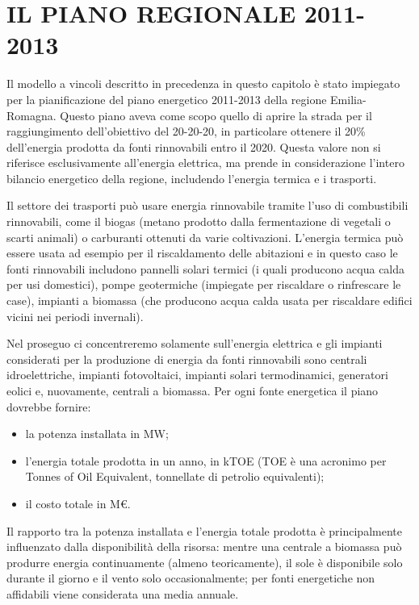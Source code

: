 \documentclass[12pt,a4paper,openright,twoside]{report}
\begin{document}
\section{IL PIANO REGIONALE 2011-2013}
Il modello a vincoli descritto in precedenza in questo capitolo è stato impiegato per la pianificazione del piano energetico 2011-2013 della regione Emilia-Romagna. Questo piano aveva come scopo quello di aprire la strada per il raggiungimento dell'obiettivo del 20-20-20, in particolare ottenere il 20\% dell'energia prodotta da fonti rinnovabili entro il 2020. Questa valore non si riferisce esclusivamente all'energia elettrica, ma prende in considerazione l'intero bilancio energetico della regione, includendo l'energia termica e i trasporti. 

Il settore dei trasporti può usare energia rinnovabile tramite l'uso di combustibili rinnovabili, come il biogas (metano prodotto dalla fermentazione di vegetali o scarti animali) o carburanti ottenuti da varie coltivazioni. L'energia termica può essere usata ad esempio per il riscaldamento delle abitazioni e in questo caso le fonti rinnovabili includono pannelli solari termici (i quali producono acqua calda per usi domestici), pompe geotermiche (impiegate per riscaldare o rinfrescare le case), impianti a biomassa (che producono acqua calda usata per riscaldare edifici vicini nei periodi invernali). 

Nel proseguo ci concentreremo solamente sull'energia elettrica e gli impianti considerati per la produzione di energia da fonti rinnovabili sono centrali idroelettriche, impianti fotovoltaici, impianti solari termodinamici, generatori eolici e, nuovamente, centrali a biomassa. Per ogni fonte energetica il piano dovrebbe fornire:
\begin{itemize}
\item la potenza installata in MW;
\item l'energia totale prodotta in un anno, in kTOE (TOE è una acronimo per Tonnes of Oil Equivalent, tonnellate di petrolio equivalenti);
\item il costo totale in M\euro.
\end{itemize} 
Il rapporto tra la potenza installata e l'energia totale prodotta è principalmente influenzato dalla disponibilità della risorsa: mentre una centrale a biomassa può produrre energia continuamente (almeno teoricamente), il sole è disponibile solo durante il giorno e il vento solo occasionalmente; per fonti energetiche non affidabili viene considerata una media annuale. 
\end{document}

